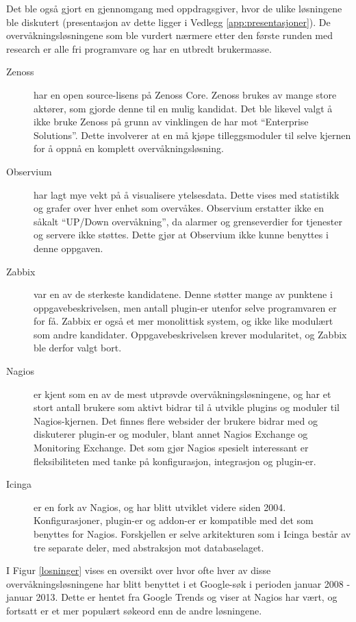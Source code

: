 Det ble også gjort en gjennomgang med oppdragsgiver, hvor de ulike løsningene ble diskutert (presentasjon av dette ligger i Vedlegg \ref{app:presentasjoner}). De overvåkningsløsningene som ble vurdert nærmere etter den første runden med research er alle fri programvare og har en utbredt brukermasse. 
\begin{description}
\item[Zenoss] har en open source-lisens på Zenoss Core. Zenoss brukes av mange store aktører\cite{zenoss}, som gjorde denne til en mulig kandidat. Det ble likevel valgt å ikke bruke Zenoss på grunn av vinklingen de har mot ``Enterprise Solutions''\cite{zenpacks}. Dette involverer at en må kjøpe tilleggsmoduler til selve kjernen for å oppnå en komplett overvåkningsløsning.

\item[Observium] har lagt mye vekt på å visualisere ytelsesdata. Dette vises med statistikk og grafer over hver enhet som overvåkes. Observium erstatter ikke en såkalt ``UP/Down overvåkning'', da alarmer og grenseverdier for tjenester og servere ikke støttes\cite{observium}. Dette gjør at Observium ikke kunne benyttes i denne oppgaven.

\item[Zabbix]\cite{zabbix} var en av de sterkeste kandidatene. Denne støtter mange av punktene i oppgavebeskrivelsen, men antall plugin-er utenfor selve programvaren er for få. Zabbix er også et mer monolittisk system, og ikke like modulært som andre kandidater\cite{zabbixandnagios}. Oppgavebeskrivelsen krever modularitet, og Zabbix ble derfor valgt bort. 

\item[Nagios] er kjent som en av de mest utprøvde overvåkningsløsningene\cite{wiki:nagios,monitoringsetup,opensourcewatch,sectools}, og har et stort antall brukere som aktivt bidrar til å utvikle plugins og moduler til Nagios-kjernen\cite{nagioscommunity}. Det finnes flere websider der brukere bidrar med og diskuterer plugin-er og moduler, blant annet Nagios Exchange\cite{nagiosexchange} og Monitoring Exchange\cite{monitoringexchange}. Det som gjør Nagios spesielt interessant er fleksibiliteten med tanke på konfigurasjon, integrasjon og plugin-er.

\item[Icinga] er en fork av Nagios, og har blitt utviklet videre siden 2004. Konfigurasjoner, plugin-er og addon-er er kompatible med det som benyttes for Nagios. Forskjellen er selve arkitekturen som i Icinga består av tre separate deler, med abstraksjon mot databaselaget. 
\end{description}
I Figur \ref{losninger} vises en oversikt over hvor ofte hver av disse overvåkningsløsningene har blitt benyttet i et Google-søk i perioden januar 2008 - januar 2013. Dette er hentet fra Google Trends og viser at Nagios har vært, og fortsatt er et mer populært søkeord enn de andre løsningene.

